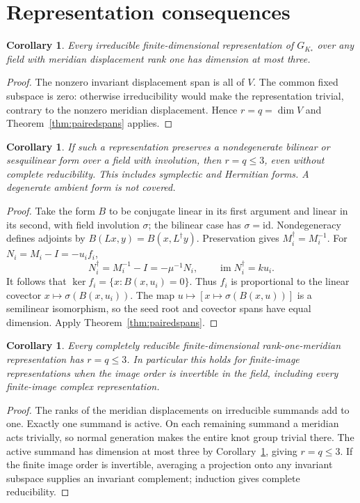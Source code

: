 \documentclass[11pt]{article}
\newtheorem{corollary}[theorem]{Corollary}
\begin{document}
\section{Representation consequences}

\begin{corollary}\label{cor:irreducible}
Every irreducible finite-dimensional representation of $G_{K_*}$
over any field with meridian displacement rank one has dimension
at most three.
\end{corollary}
\begin{proof}
The nonzero invariant displacement span is all of $V$.
The common fixed subspace is zero: otherwise irreducibility
would make the representation trivial, contrary to the
nonzero meridian displacement. Hence $r=q=\dim V$ and
Theorem~\ref{thm:pairedspans} applies.
\end{proof}

\begin{corollary}\label{cor:forms}
If such a representation preserves a nondegenerate bilinear or
sesquilinear form over a field with involution, then $r=q\le3$,
even without complete reducibility. This includes symplectic
and Hermitian forms. A degenerate ambient form is not covered.
\end{corollary}
\begin{proof}
Take the form $B$ to be conjugate linear in its first argument
and linear in its second, with field involution $\sigma$;
the bilinear case has $\sigma=\mathrm{id}$.
Nondegeneracy defines adjoints by $B(Lx,y)=B(x,L^\dagger y)$.
Preservation gives $M_i^\dagger=M_i^{-1}$. For
$N_i=M_i-I=-u_if_i$,
\[
 N_i^\dagger=M_i^{-1}-I=-\mu^{-1}N_i,\qquad
 \operatorname{im}N_i^\dagger=ku_i .
\]
It follows that
$\ker f_i=\{x:B(x,u_i)=0\}$.
Thus $f_i$ is proportional to the linear covector
$x\mapsto\sigma(B(x,u_i))$.
The map $u\mapsto[x\mapsto\sigma(B(x,u))]$ is a semilinear
isomorphism, so the seed root and covector spans have equal
dimension. Apply Theorem~\ref{thm:pairedspans}.
\end{proof}

\begin{corollary}\label{cor:semisimple}
Every completely reducible finite-dimensional rank-one-meridian
representation has $r=q\le3$. In particular this holds for
finite-image representations when the image order is invertible
in the field, including every finite-image complex representation.
\end{corollary}
\begin{proof}
The ranks of the meridian displacements on irreducible summands
add to one. Exactly one summand is active. On each remaining
summand a meridian acts trivially, so normal generation makes
the entire knot group trivial there.
The active summand has dimension at most three by
Corollary~\ref{cor:irreducible}, giving $r=q\le3$.
If the finite image order is invertible, averaging a projection
onto any invariant subspace supplies an invariant complement;
induction gives complete reducibility.
\end{proof}
\end{document}
